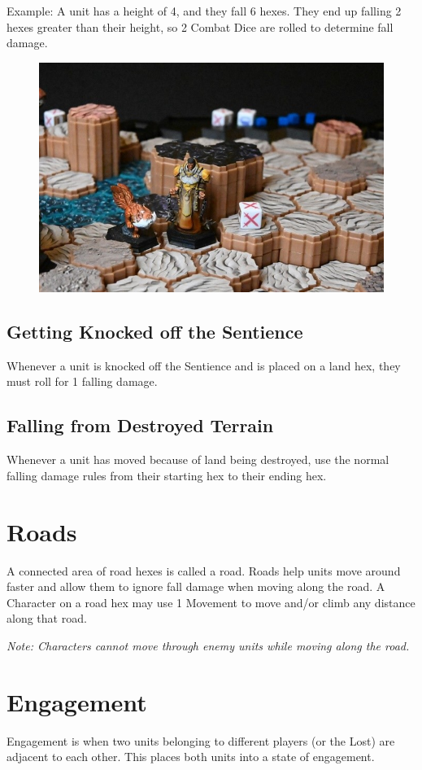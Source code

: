 \documentclass[../main.tex]{subfiles}
\begin{document}
Example: A unit has a height of 4, and they fall 6 hexes. They end up falling 2 hexes greater than their height, so 2 Combat Dice are rolled to determine fall damage. 
\begin{figure}[h]
    \centering
    \includegraphics[width=0.85\linewidth]{chapters//Movement/TimeStrikeFallDamage2.jpg}
\end{figure}

\subsection{Getting Knocked off the Sentience}
Whenever a unit is knocked off the Sentience and is placed on a land hex, they must roll for 1 falling damage. 

\subsection{Falling from Destroyed Terrain}
Whenever a unit has moved because of land being destroyed, use the normal falling damage rules from their starting hex to their ending hex. 

\section{Roads}
A connected area of road hexes is called a road. Roads help units move around faster and allow them to ignore fall damage when moving along the road. A Character on a road hex may use 1 Movement to move and/or climb any distance along that road.

\textit{Note: Characters cannot move through enemy units while moving along the road.}

\section{Engagement}
Engagement is when two units belonging to different players (or the Lost) are adjacent to each other. This places both units into a state of engagement.
\end{document}
